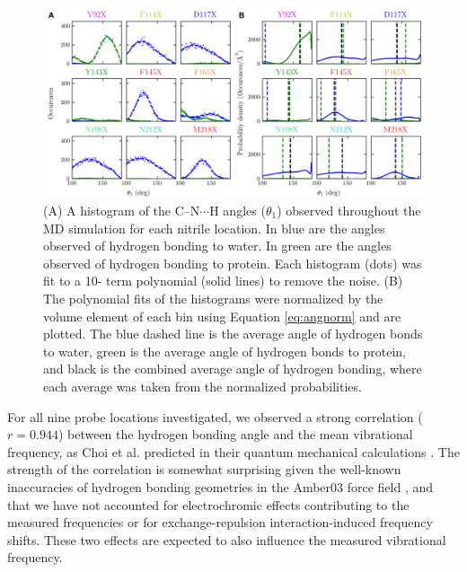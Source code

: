 \begin{figure}
    \center
    \includegraphics[width=\double]{figures-gfp-hbond/FigureS4_combined.png}
    \caption{
        (A) A histogram of the C--N$\cdots$H angles ($\theta_1$) observed throughout the MD simulation for each nitrile location. 
        In blue are the angles observed of hydrogen bonding to water. 
        In green are the angles observed of hydrogen bonding to protein. 
        Each histogram (dots) was fit to a 10- term polynomial (solid lines) to remove the noise. 
        (B) The polynomial fits of the histograms were normalized by the volume element of each bin using Equation \ref{eq:angnorm} and are plotted. 
        The blue dashed line is the average angle of hydrogen bonds to water, green is the average angle of hydrogen bonds to protein, and black is the combined average angle of hydrogen bonding, where each average was taken from the normalized probabilities.
    }
    \label{fig:hbond-theta_histogram}
\end{figure}

For all nine probe locations investigated, we observed a strong correlation ($r = 0.944$) between the hydrogen bonding angle and the mean vibrational frequency, as Choi et al. predicted in their quantum mechanical calculations \cite{Choi2008}.
The strength of the correlation is somewhat surprising given the well-known inaccuracies of hydrogen bonding geometries in the Amber03 force field \cite{Paton2009}, and that we have not accounted for electrochromic effects contributing to the measured frequencies or for exchange-repulsion interaction-induced frequency shifts.
These two effects are expected to also influence the measured vibrational frequency.  

